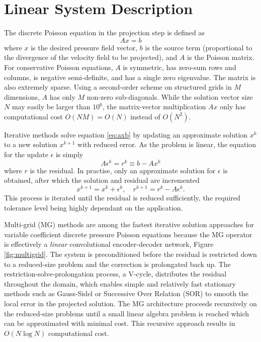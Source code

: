 \documentclass[review]{elsarticle}
\begin{document}
\section{Linear System Description}

The discrete Poisson equation in the projection step is defined as
\begin{equation}\label{eq:axb}
    A x = b
\end{equation}
where $x$ is the desired pressure field vector, $b$ is the source term (proportional to the divergence of the velocity field to be projected), and $A$ is the Poisson matrix. For conservative Poisson equations, $A$ is symmetric, has zero-sum rows and columns, is negative semi-definite, and has a single zero eigenvalue. The matrix is also extremely sparse. Using a second-order scheme on structured grids in $M$ dimensions, $A$ has only $M$ non-zero sub-diagonals. While the solution vector size $N$ may easily be larger than $10^6$, the matrix-vector multiplication $Ax$ only has computational cost $O(NM)=O(N)$ instead of $O(N^2)$.

Iterative methods solve equation \ref{eq:axb} by updating an approximate solution $x^k$ to a new solution $x^{k+1}$ with reduced error. As the problem is linear, the equation for the update $\epsilon$ is simply
\begin{equation}\label{eq:aer} 
    A \epsilon^k = r^k \equiv b - Ax^k
\end{equation}
where $r$ is the residual. In practise, only an approximate solution for $\epsilon$ is obtained, after which the solution and residual are incremented
\begin{equation}
    x^{k+1} = x^k+\epsilon^k, \quad r^{k+1} = r^k-A\epsilon^k.
\end{equation}
This process is iterated until the residual is reduced sufficiently, the required tolerance level being highly dependant on the application.

Multi-grid (MG) methods are among the fastest iterative solution approaches for variable coefficient discrete pressure Poisson equations because the MG operator is effectively a \textit{linear} convolutional encoder-decoder network, Figure \ref{fig:multigrid}. The system is preconditioned before the residual is restricted down to a reduced-size problem and the correction is prolongated back up. 
The restriction-solve-prolongation process, a V-cycle, distributes the residual throughout the domain, which enables simple and relatively fast stationary methods such as Gauss-Sidel or Successive Over Relation (SOR) to smooth the local error in the projected solution. The MG architecture proceeds recursively on the reduced-size problems until a small linear algebra problem is reached which can be approximated with minimal cost. This recursive approach results in $O(N\log N)$ computational cost.
\end{document}
